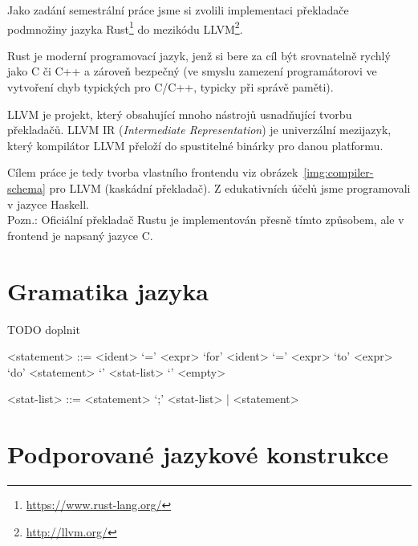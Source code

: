 \documentclass[12pt,a4paper]{article}
\begin{document}
Jako zadání semestrální práce jsme si zvolili implementaci překladače podmnožiny jazyka Rust\footnote{\url{https://www.rust-lang.org/}} do mezikódu LLVM\footnote{\url{http://llvm.org/}}. 

Rust je moderní programovací jazyk, jenž si bere za cíl být srovnatelně rychlý jako C či C++ a zároveň bezpečný (ve smyslu zamezení programátorovi ve vytvoření chyb typických pro C/C++, typicky při správě paměti).

LLVM je projekt, který obsahující mnoho nástrojů usnadňující tvorbu překladačů. LLVM IR (\textit{Intermediate Representation}) je univerzální mezijazyk, který kompilátor LLVM přeloží do spustitelné binárky pro danou platformu.

Cílem práce je tedy tvorba vlastního frontendu viz obrázek~\ref{img:compiler-schema} pro LLVM (kaskádní překladač). Z edukativních účelů jsme programovali v jazyce Haskell.\\

Pozn.: Oficiální překladač Rustu je implementován přesně tímto způsobem, ale v frontend je napsaný jazyce C.


\section{Gramatika jazyka}

\setlength{\grammarparsep}{20pt plus 1pt minus 1pt} %
\setlength{\grammarindent}{12em} %

TODO doplnit

\begin{grammar}

<statement> ::= <ident> `=' <expr> 
\alt `for' <ident> `=' <expr> `to' <expr> `do' <statement> 
\alt `{' <stat-list> `}' 
\alt <empty> 

<stat-list> ::= <statement> `;' <stat-list> | <statement> 

\end{grammar}


\section{Podporované jazykové konstrukce}
\end{document}
